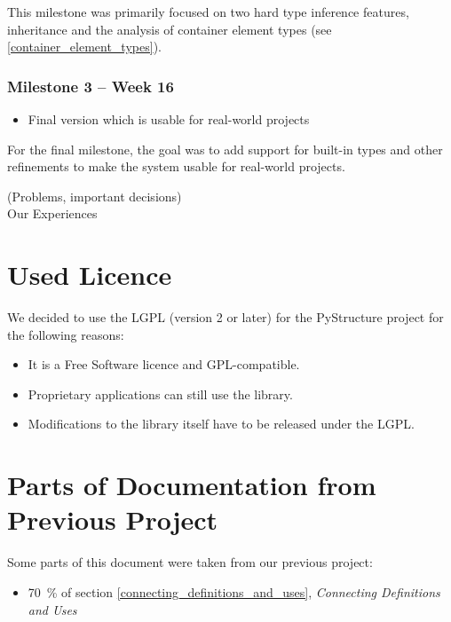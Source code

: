 \documentclass[12pt,halfparskip,DIV11,BCOR10mm]{scrreprt}
\begin{document}
This milestone was primarily focused on two hard type inference features, inheritance and the analysis of container element types (see \vref{container_element_types}).


\subsubsection{Milestone 3 – Week 16}

\begin{itemize}
    \item Final version which is usable for real-world projects
\end{itemize}

For the final milestone, the goal was to add support for built-in types and other refinements to make the system usable for real-world projects.


 (Problems, important decisions) \\
 Our Experiences

\section{Used Licence}

We decided to use the LGPL (version 2 or later) for the PyStructure project for the following reasons:

\begin{itemize}
    \item It is a Free Software licence and GPL-compatible.
    \item Proprietary applications can still use the library.
    \item Modifications to the library itself have to be released under the LGPL.
\end{itemize}

\section{Parts of Documentation from Previous Project}

Some parts of this document were taken from our previous project:

\begin{itemize}
    \item 70~\% of section \vref{connecting_definitions_and_uses}, \emph{Connecting Definitions and Uses}
\end{itemize}
\end{document}
